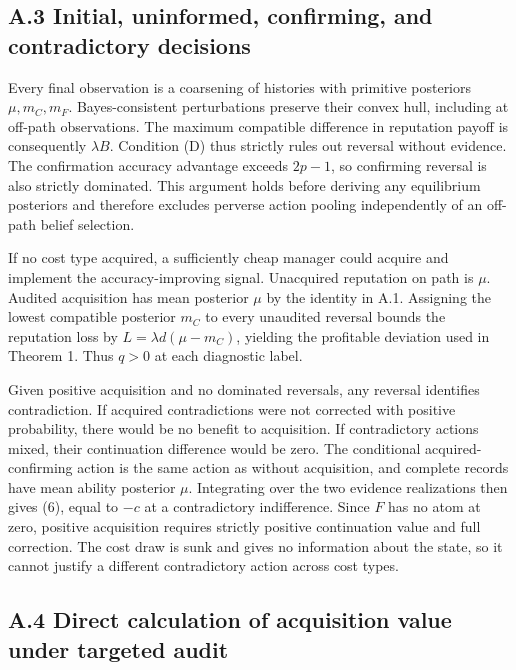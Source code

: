 \documentclass[
  11pt,
]{article}
\begin{document}
\subsection{A.3 Initial, uninformed, confirming, and contradictory
decisions}\label{a.3-initial-uninformed-confirming-and-contradictory-decisions}

Every final observation is a coarsening of histories with primitive
posteriors \(\mu,m_C,m_F\). Bayes-consistent perturbations preserve
their convex hull, including at off-path observations. The maximum
compatible difference in reputation payoff is consequently
\(\lambda B\). Condition (D) thus strictly rules out reversal without
evidence. The confirmation accuracy advantage exceeds \(2p-1\), so
confirming reversal is also strictly dominated. This argument holds
before deriving any equilibrium posteriors and therefore excludes
perverse action pooling independently of an off-path belief selection.

If no cost type acquired, a sufficiently cheap manager could acquire and
implement the accuracy-improving signal. Unacquired reputation on path
is \(\mu\). Audited acquisition has mean posterior \(\mu\) by the
identity in A.1. Assigning the lowest compatible posterior \(m_C\) to
every unaudited reversal bounds the reputation loss by
\(L=\lambda d(\mu-m_C)\), yielding the profitable deviation used in
Theorem 1. Thus \(q>0\) at each diagnostic label.

Given positive acquisition and no dominated reversals, any reversal
identifies contradiction. If acquired contradictions were not corrected
with positive probability, there would be no benefit to acquisition. If
contradictory actions mixed, their continuation difference would be
zero. The conditional acquired-confirming action is the same action as
without acquisition, and complete records have mean ability posterior
\(\mu\). Integrating over the two evidence realizations then gives (6),
equal to \(-c\) at a contradictory indifference. Since \(F\) has no atom
at zero, positive acquisition requires strictly positive continuation
value and full correction. The cost draw is sunk and gives no
information about the state, so it cannot justify a different
contradictory action across cost types.

\subsection{A.4 Direct calculation of acquisition value under targeted
audit}\label{a.4-direct-calculation-of-acquisition-value-under-targeted-audit}
\end{document}
